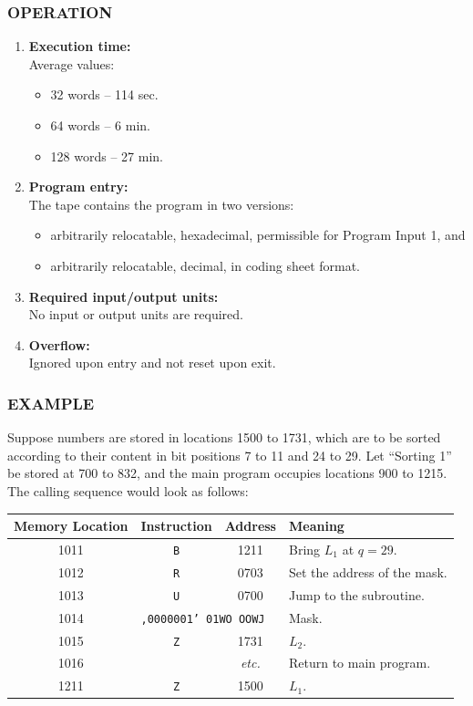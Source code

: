 \subsubsection*{OPERATION}
\begin{enumerate}
    \item \textbf{Execution time:} \\
    Average values:
    \begin{itemize}
        \item 32 words -- 114 sec.
        \item 64 words -- 6 min.
        \item 128 words -- 27 min.
    \end{itemize}
    \item \textbf{Program entry:} \\
    The tape contains the program in two versions:
    \begin{itemize}
        \item[a)] arbitrarily relocatable, hexadecimal, permissible for Program Input 1, and
        \item[b)] arbitrarily relocatable, decimal, in coding sheet format.
    \end{itemize}
    \item \textbf{Required input/output units:} \\
    No input or output units are required.
    \item \textbf{Overflow:} \\
    Ignored upon entry and not reset upon exit.
\end{enumerate}

\subsubsection*{EXAMPLE}
Suppose numbers are stored in locations 1500 to 1731, which are to be sorted according to their content in bit positions 7 to 11 and 24 to 29. Let ``Sorting 1'' be stored at 700 to 832, and the main program occupies locations 900 to 1215. The calling sequence would look as follows:

\begin{table}[h!]
\centering
\begin{tabularx}{\textwidth}{cccX}
\toprule
\textbf{Memory Location} & \textbf{Instruction} & \textbf{Address} & \textbf{Meaning} \\
\midrule
1011 & \texttt{B} & 1211 & Bring $L_1$ at $q=29$. \\
1012 & \texttt{R} & 0703 & Set the address of the mask. \\
1013 & \texttt{U} & 0700 & Jump to the subroutine. \\
1014 & \multicolumn{2}{l}{\texttt{,0000001' 01WO OOWJ}} & Mask. \\
1015 & \texttt{Z} & 1731 & $L_2$. \\
1016 &            & \textit{etc.} & Return to main program. \\
\midrule
1211 & \texttt{Z} & 1500 & $L_1$. \\
\bottomrule
\end{tabularx}
\end{table}

